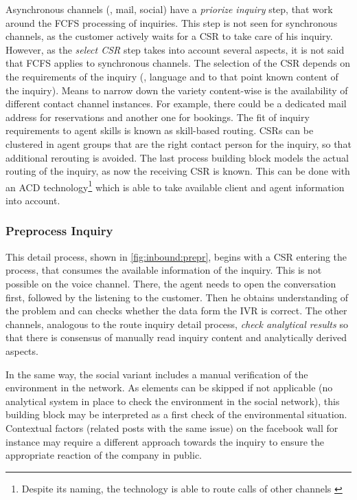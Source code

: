 	 Asynchronous channels (\ie, mail, social) have a \textit{priorize inquiry} step, that work around the \acrshort{FCFS} processing of inquiries. This step is not seen for synchronous channels, as the customer actively waits for a \acrshort{CSR} to take care of his inquiry. However, as the \textit{select  \acrshort{CSR}} step takes into account several aspects, it is not said that \acrshort{FCFS} applies to synchronous channels. The selection of the  \acrshort{CSR} depends on the requirements of the inquiry (\ie, language and to that point known content of the inquiry). Means to narrow down the variety content-wise is the availability of different contact channel instances. For example, there could be a dedicated mail address for reservations and another one for bookings. The fit of inquiry requirements to agent skills is known as skill-based routing. \acrshort{CSR}s can be clustered in agent groups that are the right contact person for the inquiry, so that additional rerouting is avoided. The last process building block models the actual routing of the inquiry, as now the receiving  \acrshort{CSR} is known. This can be done with an \acrfull{ACD} technology\footnote{Despite its naming, the technology is able to route calls of other channels \citep{ccn2016} } which is able to take available client and agent information into account.
	 
	 
	 \subsubsection{Preprocess Inquiry}
	 
	 This detail process, shown in \Fig \ref{fig:inbound:prepr}, begins with a \acrshort{CSR} entering the process, that consumes the available information of the inquiry. This is not possible on the voice channel. There, the agent needs to open the conversation first, followed by the listening to the customer. Then he obtains understanding of the problem and can checks whether the data form the \acrshort{IVR} is correct. The other channels, analogous to the route inquiry detail process, \textit{check analytical results} so that there is consensus of manually read inquiry content and analytically derived aspects.
	 
	 In the same way, the social variant includes a manual verification of the environment in the network. As elements can be skipped if not applicable (\ie no analytical system in place to check the environment in the social network), this building block may be interpreted as a first check of the environmental situation. Contextual factors (related posts with the same issue) on the facebook wall for instance may require a different approach towards the inquiry to ensure the appropriate reaction of the company in public.   
	 
